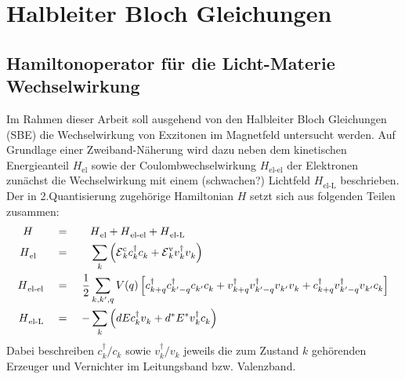\documentclass[a4paper,11pt, twoside]{article}
\newcommand{\ind}[2]{{_{#1}^{#2}}}
\newcommand{\+}{\dagger}
\newcommand{\E}{\mathcal{E}}
\renewcommand{\^}{\hat}
\renewcommand{\tt}{\text}
\renewcommand{\~}{\widetilde}
\begin{document}
\section{Halbleiter Bloch Gleichungen}
\subsection{Hamiltonoperator für die Licht-Materie Wechselwirkung}
Im Rahmen dieser Arbeit soll ausgehend von den Halbleiter Bloch Gleichungen (SBE) die Wechselwirkung von Exzitonen im Magnetfeld untersucht werden. Auf Grundlage einer Zweiband-Näherung wird dazu neben dem kinetischen Energieanteil $H\ind{\tt{el}}{}$ sowie der Coulombwechselwirkung $H\ind{\tt{el-el}}{}$ der Elektronen zunächst die Wechselwirkung mit einem (schwachen?) Lichtfeld $H\ind{\tt{el-L}}{}$ beschrieben. Der in 2.Quantisierung zugehörige Hamiltonian $H$ setzt sich aus folgenden Teilen zusammen: 
\begin{alignat*}{3}
H \quad  				&&\ = \ && &H\ind{\tt{el}}{} +H\ind{\tt {el-el}}{}+H\ind{\tt {el-L}}{} \\
H\ind{\tt{el}}{} 	\ \	&&\ = \ && &\sum_k\left (			\E \ind{k}{\tt c} c\ind{k}{\+}c\ind{k}{} +\E \ind{k}{\tt {v}}v\ind{k}{\+}v\ind{k}{}    	\right ) \\
H\ind{\tt {el-el}}{} &&\ = \ &&\frac{1}{2}&\sum_{k,k',q} V(q)\left [			c\ind{k+q}{\+} c\ind{k'-q}{\+}c\ind{k'}{}c\ind{k}{} +v\ind{k+q}{\+}v\ind{k'-q}{\+}v\ind{k'}{}v\ind{k}{}   +  	 	c\ind{k+q}{\+}v\ind{k'-q}{\+}v\ind{k'}{}c\ind{k}{}    	\right ] \\
H\ind{\tt {el-L}}{} 	&&\ = \ && -&\sum_{k} \left (dE c\ind{k}{\+}v\ind{k}{} + d^*E^*v\ind{k}{\+}c\ind{k}{}\right ) 
\end{alignat*}
Dabei beschreiben $c\ind{k}{\+}/c\ind{k}{}$ sowie $v\ind{k}{\+}/v\ind{k}{}$ jeweils die zum Zustand $k$ gehörenden Erzeuger und Vernichter im Leitungsband bzw. Valenzband. 
\end{document}

